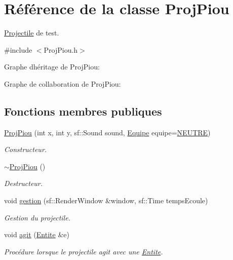 \hypertarget{class_proj_piou}{}\section{Référence de la classe Proj\+Piou}
\label{class_proj_piou}


\hyperlink{class_projectile}{Projectile} de test.  




{\ttfamily \#include $<$Proj\+Piou.\+h$>$}



Graphe d\textquotesingle{}héritage de Proj\+Piou\+:


Graphe de collaboration de Proj\+Piou\+:
\subsection*{Fonctions membres publiques}
\begin{DoxyCompactItemize}
\item 
\hyperlink{class_proj_piou_a4f762d33904c082e226a2170e83ba544}{Proj\+Piou} (int x, int y, sf\+::\+Sound sound, \hyperlink{constantes_8h_a08fa5554288d5031a8f3bb83cc04ee83}{Equipe} equipe=\hyperlink{constantes_8h_a08fa5554288d5031a8f3bb83cc04ee83a31ad00d2974deb1103ea000de3bff57d}{N\+E\+U\+T\+RE})
\begin{DoxyCompactList}\small\item\em Constructeur. \end{DoxyCompactList}\item 
\hyperlink{class_proj_piou_a02224f153ad53afc2b1c40b986ec6492}{$\sim$\+Proj\+Piou} ()
\begin{DoxyCompactList}\small\item\em Destructeur. \end{DoxyCompactList}\item 
void \hyperlink{class_proj_piou_a6efae1f583527446ef824fc1d2823a02}{gestion} (sf\+::\+Render\+Window \&window, sf\+::\+Time temps\+Ecoule)
\begin{DoxyCompactList}\small\item\em Gestion du projectile. \end{DoxyCompactList}\item 
void \hyperlink{class_proj_piou_afd492e686378a86e10136061af035a9f}{agit} (\hyperlink{class_entite}{Entite} \&e)
\begin{DoxyCompactList}\small\item\em Procédure lorsque le projectile agit avec une \hyperlink{class_entite}{Entite}. \end{DoxyCompactList}\end{DoxyCompactItemize}
